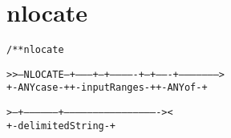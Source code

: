 \section{nlocate}
\begin{shaded}
\begin{alltt}
/** nlocate



   >>--NLOCATE--+---------+--+-------------+--+-------+--------------------->
                +-ANYcase-+  +-inputRanges-+  +-ANYof-+

   >--+-----------------+-------------------------------------------------><
      +-delimitedString-+

\end{alltt}
\end{shaded}
